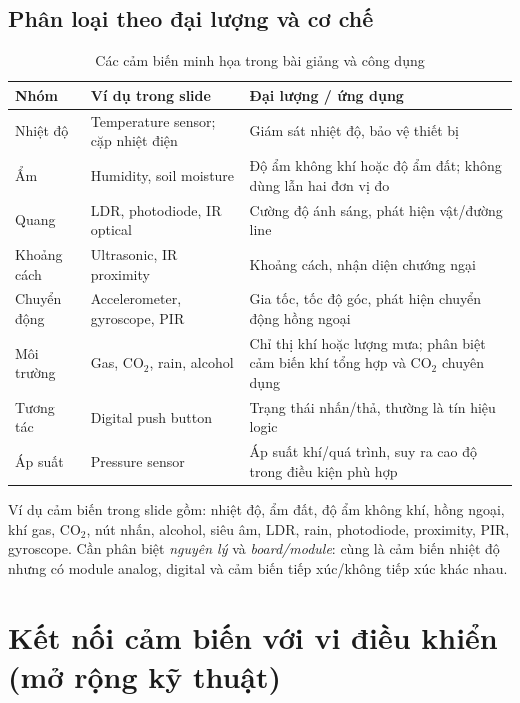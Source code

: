 \subsection{Phân loại theo đại lượng và cơ chế}
\begin{table}[htbp]\centering\footnotesize
\caption{Các cảm biến minh họa trong bài giảng và công dụng}
\begin{tabularx}{\textwidth}{p{32mm}p{40mm}X}
\toprule
Nhóm & Ví dụ trong slide & Đại lượng / ứng dụng\\\midrule
Nhiệt độ & Temperature sensor; cặp nhiệt điện & Giám sát nhiệt độ, bảo vệ thiết bị\\
Ẩm & Humidity, soil moisture & Độ ẩm không khí hoặc độ ẩm đất; không dùng lẫn hai đơn vị đo\\
Quang & LDR, photodiode, IR optical & Cường độ ánh sáng, phát hiện vật/đường line\\
Khoảng cách & Ultrasonic, IR proximity & Khoảng cách, nhận diện chướng ngại\\
Chuyển động & Accelerometer, gyroscope, PIR & Gia tốc, tốc độ góc, phát hiện chuyển động hồng ngoại\\
Môi trường & Gas, CO$_2$, rain, alcohol & Chỉ thị khí hoặc lượng mưa; phân biệt cảm biến khí tổng hợp và CO$_2$ chuyên dụng\\
Tương tác & Digital push button & Trạng thái nhấn/thả, thường là tín hiệu logic\\
Áp suất & Pressure sensor & Áp suất khí/quá trình, suy ra cao độ trong điều kiện phù hợp\\\bottomrule
\end{tabularx}
\end{table}

Ví dụ cảm biến trong slide gồm: nhiệt độ, ẩm đất, độ ẩm không khí, hồng ngoại, khí gas, CO$_2$, nút nhấn, alcohol, siêu âm, LDR, rain, photodiode, proximity, PIR, gyroscope. Cần phân biệt \emph{nguyên lý} và \emph{board/module}: cùng là cảm biến nhiệt độ nhưng có module analog, digital và cảm biến tiếp xúc/không tiếp xúc khác nhau.

\section{Kết nối cảm biến với vi điều khiển (mở rộng kỹ thuật)}
